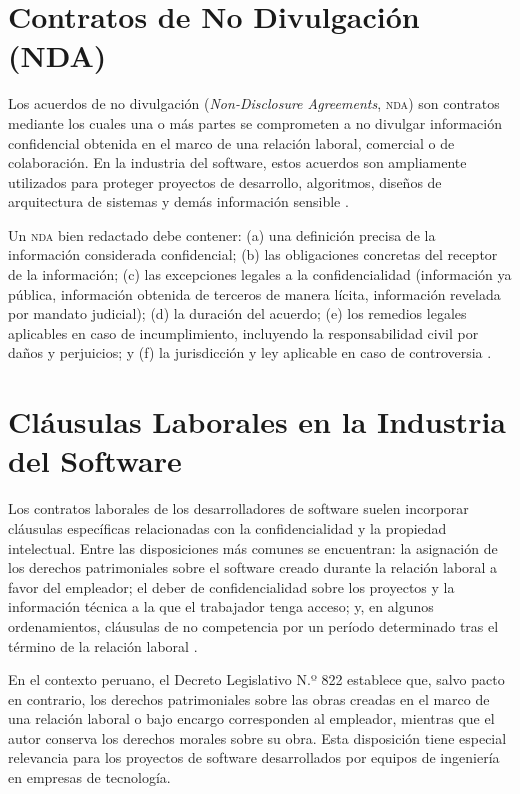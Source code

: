 \documentclass[11pt,a4paper]{report}
\begin{document}
\section{Contratos de No Divulgación (NDA)}

Los acuerdos de no divulgación (\textit{Non-Disclosure Agreements}, \textsc{nda}) son contratos mediante los cuales una o más partes se comprometen a no divulgar información confidencial obtenida en el marco de una relación laboral, comercial o de colaboración. En la industria del software, estos acuerdos son ampliamente utilizados para proteger proyectos de desarrollo, algoritmos, diseños de arquitectura de sistemas y demás información sensible \citep{ompi2024}.

Un \textsc{nda} bien redactado debe contener: (a) una definición precisa de la información considerada confidencial; (b) las obligaciones concretas del receptor de la información; (c) las excepciones legales a la confidencialidad (información ya pública, información obtenida de terceros de manera lícita, información revelada por mandato judicial); (d) la duración del acuerdo; (e) los remedios legales aplicables en caso de incumplimiento, incluyendo la responsabilidad civil por daños y perjuicios; y (f) la jurisdicción y ley aplicable en caso de controversia \citep{indecopi2023}.

\section{Cláusulas Laborales en la Industria del Software}

Los contratos laborales de los desarrolladores de software suelen incorporar cláusulas específicas relacionadas con la confidencialidad y la propiedad intelectual. Entre las disposiciones más comunes se encuentran: la asignación de los derechos patrimoniales sobre el software creado durante la relación laboral a favor del empleador; el deber de confidencialidad sobre los proyectos y la información técnica a la que el trabajador tenga acceso; y, en algunos ordenamientos, cláusulas de no competencia por un período determinado tras el término de la relación laboral \citep{indecopi2023}.

En el contexto peruano, el Decreto Legislativo N.º 822 establece que, salvo pacto en contrario, los derechos patrimoniales sobre las obras creadas en el marco de una relación laboral o bajo encargo corresponden al empleador, mientras que el autor conserva los derechos morales sobre su obra. Esta disposición tiene especial relevancia para los proyectos de software desarrollados por equipos de ingeniería en empresas de tecnología.
\end{document}
